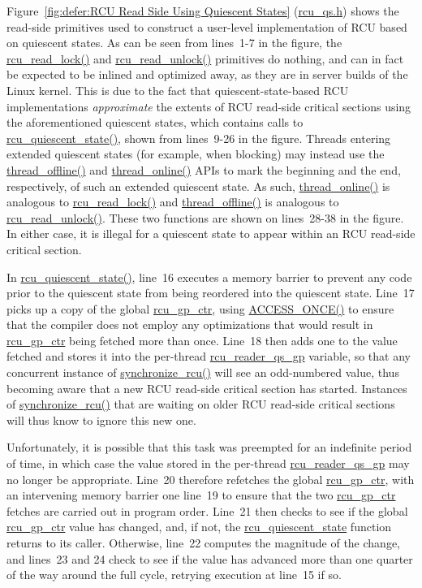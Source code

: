 Figure~\ref{fig:defer:RCU Read Side Using Quiescent States}
(\url{rcu_qs.h})
shows the read-side primitives used to construct a user-level
implementation of RCU based on quiescent states.
As can be seen from lines~1-7 in the figure, the \url{rcu_read_lock()}
and \url{rcu_read_unlock()} primitives do nothing, and can in fact
be expected to be inlined and optimized away, as they are in
server builds of the Linux kernel.
This is due to the fact that quiescent-state-based RCU implementations
\emph{approximate} the extents of RCU read-side critical sections
using the aforementioned quiescent states, which contains calls to
\url{rcu_quiescent_state()}, shown from lines~9-26 in the figure.
Threads entering extended quiescent states (for example, when blocking)
may instead use the \url{thread_offline()} and \url{thread_online()}
APIs to mark the beginning and the end, respectively, of such an
extended quiescent state.
As such, \url{thread_online()} is analogous to \url{rcu_read_lock()}
and \url{thread_offline()} is analogous to \url{rcu_read_unlock()}.
These two functions are shown on lines~28-38 in the figure.
In either case, it is illegal for a quiescent state to appear within
an RCU read-side critical section.

In \url{rcu_quiescent_state()}, line~16 executes a memory barrier
to prevent any code prior to the quiescent state from being reordered
into the quiescent state.
Line~17 picks up a copy of the global \url{rcu_gp_ctr}, using
\url{ACCESS_ONCE()} to ensure that the compiler does not employ any
optimizations that would result in \url{rcu_gp_ctr} being fetched
more than once.
Line~18 then adds one to the value fetched and stores it into
the per-thread \url{rcu_reader_qs_gp} variable, so that any concurrent
instance of \url{synchronize_rcu()} will see an odd-numbered value,
thus becoming aware that a new RCU read-side critical section has started.
Instances of \url{synchronize_rcu()} that are waiting on older
RCU read-side critical sections will thus know to ignore this new one.

Unfortunately, it is possible that this task was preempted for an
indefinite period of time, in which case the value stored in
the per-thread \url{rcu_reader_qs_gp} may no longer be appropriate.
Line~20 therefore refetches the global \url{rcu_gp_ctr}, with
an intervening memory barrier one line~19 to ensure that the two
\url{rcu_gp_ctr} fetches are carried out in program order.
Line~21 then checks to see if the global \url{rcu_gp_ctr} value has
changed, and, if not, the \url{rcu_quiescent_state} function returns
to its caller.
Otherwise, line~22 computes the magnitude of the change, and lines~23 and 24
check to see if the value has advanced more than one quarter of the way
around the full cycle, retrying execution at line~15 if so.

